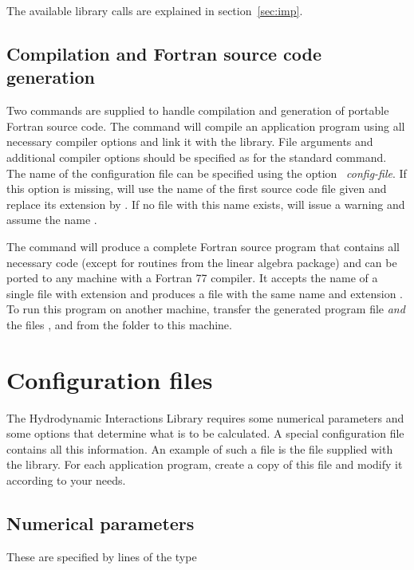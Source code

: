 The available library calls are explained in section~\ref{sec:imp}.

\subsection{Compilation and Fortran source code generation}

Two commands are supplied to handle compilation and generation of
portable Fortran source code.  The command  will compile an
application program using all necessary compiler options and link it
with the library. File arguments and additional compiler options
should be specified as for the standard  command. The
name of the configuration file can be specified using the option
~{\em config-file}\/. If this option is missing, 
will use the name of the first source code file given and
replace its extension  by . If no file with
this name exists,  will issue a warning and assume
the name .

The command  will produce a complete Fortran source
program that contains all necessary code (except for routines from the
linear algebra package) and can be ported to any machine with a
Fortran 77 compiler. It accepts the name of a single file with
extension  and produces a file with the same name and
extension . To run this program on another machine,
transfer the generated program file {\em and} the files ,
 and  from the folder 
to this machine. 

\section{Configuration files}
\label{sec:config}

The Hydrodynamic Interactions Library requires some numerical parameters
and some options that determine what is to be calculated. A special
configuration file contains all this information. An example of such
a file is the file  supplied with the library. For each
application program, create a copy of this file and modify it according
to your needs.

\subsection{Numerical parameters}

These are specified by lines of the type\\
\wsp{}

